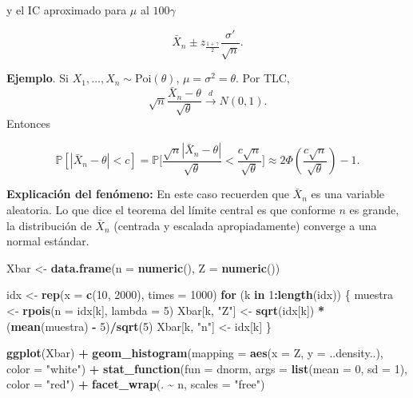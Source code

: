 \documentclass[
  12pt,
]{book}
\newenvironment{Shaded}{\begin{snugshade}}{\end{snugshade}}
\newcommand{\ControlFlowTok}[1]{\textcolor[rgb]{0.13,0.29,0.53}{\textbf{#1}}}
\newcommand{\DataTypeTok}[1]{\textcolor[rgb]{0.13,0.29,0.53}{#1}}
\newcommand{\DecValTok}[1]{\textcolor[rgb]{0.00,0.00,0.81}{#1}}
\newcommand{\KeywordTok}[1]{\textcolor[rgb]{0.13,0.29,0.53}{\textbf{#1}}}
\newcommand{\NormalTok}[1]{#1}
\newcommand{\OperatorTok}[1]{\textcolor[rgb]{0.81,0.36,0.00}{\textbf{#1}}}
\newcommand{\StringTok}[1]{\textcolor[rgb]{0.31,0.60,0.02}{#1}}
\begin{document}
y el IC aproximado para \(\mu\) al \(100\gamma\)

\[\bar X_n \pm z_{\frac{1+\gamma}2}\dfrac{\sigma'}{\sqrt n}.\]

\textbf{Ejemplo}. Si \(X_1,\dots, X_n\sim \text{Poi}(\theta)\), \(\mu =\sigma^2 = \theta\). Por TLC,
\[\sqrt n\dfrac{\bar X_n-\theta}{\sqrt{\theta}}\xrightarrow[]{d}N(0,1).\] Entonces

\[
\mathbb P[|\bar X_n-\theta|<c] = \mathbb P\bigg[\dfrac{\sqrt n|\bar X_n-\theta|}{\sqrt \theta}<\dfrac{c\sqrt n}{\sqrt \theta}\bigg] \approx 2\Phi\left(\dfrac{c\sqrt n}{\sqrt \theta}\right)-1.
\]

\textbf{Explicación del fenómeno:} En este caso recuerden que \(\bar{X}_n\) es una
variable aleatoria. Lo que dice el teorema del límite central es que conforme
\(n\) es grande, la distribución de \(\bar{X}_n\) (centrada y escalada
apropiadamente) converge a una normal estándar.

\begin{Shaded}
\begin{Highlighting}[]
\NormalTok{Xbar \textless{}{-}}\StringTok{ }\KeywordTok{data.frame}\NormalTok{(}\DataTypeTok{n =} \KeywordTok{numeric}\NormalTok{(), }\DataTypeTok{Z =} \KeywordTok{numeric}\NormalTok{())}

\NormalTok{idx \textless{}{-}}\StringTok{ }\KeywordTok{rep}\NormalTok{(}\DataTypeTok{x =} \KeywordTok{c}\NormalTok{(}\DecValTok{10}\NormalTok{, }\DecValTok{2000}\NormalTok{), }\DataTypeTok{times =} \DecValTok{1000}\NormalTok{)}
\ControlFlowTok{for}\NormalTok{ (k }\ControlFlowTok{in} \DecValTok{1}\OperatorTok{:}\KeywordTok{length}\NormalTok{(idx)) \{}
\NormalTok{    muestra \textless{}{-}}\StringTok{ }\KeywordTok{rpois}\NormalTok{(}\DataTypeTok{n =}\NormalTok{ idx[k], }\DataTypeTok{lambda =} \DecValTok{5}\NormalTok{)}
\NormalTok{    Xbar[k, }\StringTok{"Z"}\NormalTok{] \textless{}{-}}\StringTok{ }\KeywordTok{sqrt}\NormalTok{(idx[k]) }\OperatorTok{*}\StringTok{ }\NormalTok{(}\KeywordTok{mean}\NormalTok{(muestra) }\OperatorTok{{-}}\StringTok{ }
\StringTok{        }\DecValTok{5}\NormalTok{)}\OperatorTok{/}\KeywordTok{sqrt}\NormalTok{(}\DecValTok{5}\NormalTok{)}
\NormalTok{    Xbar[k, }\StringTok{"n"}\NormalTok{] \textless{}{-}}\StringTok{ }\NormalTok{idx[k]}
\NormalTok{\}}



\KeywordTok{ggplot}\NormalTok{(Xbar) }\OperatorTok{+}\StringTok{ }\KeywordTok{geom\_histogram}\NormalTok{(}\DataTypeTok{mapping =} \KeywordTok{aes}\NormalTok{(}\DataTypeTok{x =}\NormalTok{ Z, }
    \DataTypeTok{y =}\NormalTok{ ..density..), }\DataTypeTok{color =} \StringTok{"white"}\NormalTok{) }\OperatorTok{+}\StringTok{ }\KeywordTok{stat\_function}\NormalTok{(}\DataTypeTok{fun =}\NormalTok{ dnorm, }
    \DataTypeTok{args =} \KeywordTok{list}\NormalTok{(}\DataTypeTok{mean =} \DecValTok{0}\NormalTok{, }\DataTypeTok{sd =} \DecValTok{1}\NormalTok{), }\DataTypeTok{color =} \StringTok{"red"}\NormalTok{) }\OperatorTok{+}\StringTok{ }
\StringTok{    }\KeywordTok{facet\_wrap}\NormalTok{(. }\OperatorTok{\textasciitilde{}}\StringTok{ }\NormalTok{n, }\DataTypeTok{scales =} \StringTok{"free"}\NormalTok{)}
\end{Highlighting}
\end{Shaded}
\end{document}
